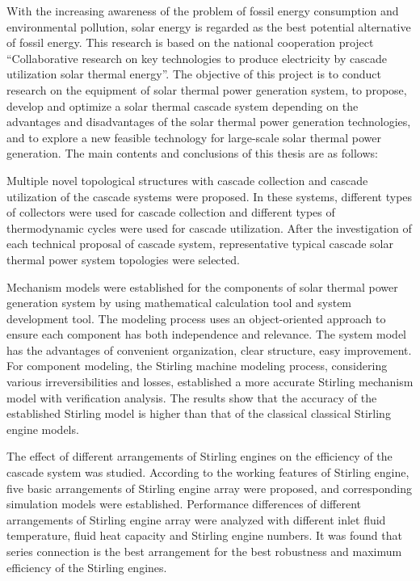 \enabstract
{
With the increasing awareness of the problem of fossil energy consumption and environmental pollution, solar energy is regarded as the best potential alternative of fossil energy. This research is based on the national cooperation project ``Collaborative research on key technologies to produce electricity by cascade utilization solar thermal energy''. The objective of this project is to conduct research on the equipment of solar thermal power generation system, to propose, develop and optimize a solar thermal cascade system depending on the advantages and disadvantages of the solar thermal power generation technologies, and to explore a new feasible technology for large-scale solar thermal power generation. The main contents and conclusions of this thesis are as follows:

Multiple novel topological structures with cascade collection and cascade utilization of the cascade systems were proposed. In these systems, different types of collectors were used for cascade collection and different types of thermodynamic cycles were used for cascade utilization. After the investigation of each technical proposal of cascade system, representative typical cascade solar thermal power system topologies were selected.

Mechanism models were established for the components of solar thermal power generation system by using mathematical calculation tool and system development tool. The modeling process uses an object-oriented approach to ensure each component has both independence and relevance. The system model has the advantages of convenient organization, clear structure, easy improvement. For component modeling, the Stirling machine modeling process, considering various irreversibilities and losses, established a more accurate Stirling mechanism model with verification analysis. The results show that the accuracy of the established Stirling model is higher than that of the classical classical Stirling engine models.

The effect of different arrangements of Stirling engines on the efficiency of the cascade system was studied. 
According to the working features of Stirling engine, five basic arrangements of Stirling engine array were proposed, and corresponding simulation models were established.
Performance differences of different arrangements of Stirling engine array were analyzed with different inlet fluid temperature, fluid heat capacity and Stirling engine numbers.
It was found that series connection is the best arrangement for the best robustness and maximum efficiency of the Stirling engines.

}
